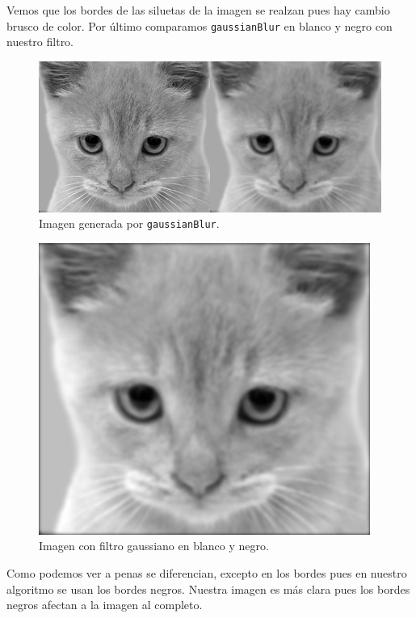 \documentclass[12pt]{article}
\begin{document}
Vemos que los bordes de las siluetas de la imagen se realzan pues hay cambio brusco de color. Por último comparamos \texttt{gaussianBlur} en blanco y negro con nuestro filtro.\\
\begin{figure}[H]
\centering
\includegraphics[scale=0.45]{images/GaussianCatBlur.png} 
\caption{Imagen generada por \texttt{gaussianBlur}.}
\label{etiqueta}
\end{figure}
\begin{figure}[H]
\centering
\includegraphics[scale=0.45]{images/GaussianCatBW.png} 
\caption{Imagen con filtro gaussiano en blanco y negro.}
\label{etiqueta}
\end{figure}
Como podemos ver a penas se diferencian, excepto en los bordes pues en nuestro algoritmo se usan los bordes negros. Nuestra imagen es más clara pues los bordes negros afectan a la imagen al completo.
\end{document}
